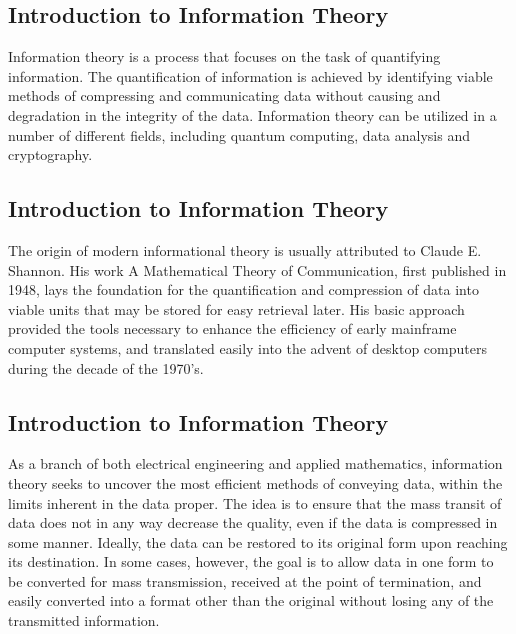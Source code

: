 


\begin{frame}
\subsection*{Introduction to Information Theory}
Information theory is a process that focuses on the task of quantifying information. 
The quantification of information is achieved by identifying viable methods of compressing and communicating data without causing 
and degradation in the integrity of the data. Information theory can be utilized in a number of different fields, including quantum computing, 
data analysis and cryptography.
\end{frame}
\begin{frame}
\subsection*{Introduction to Information Theory}
The origin of modern informational theory is usually attributed to Claude E. Shannon. His work A Mathematical Theory of Communication, first published in 1948, 
lays the foundation for the quantification and compression of data into viable units that may be stored for easy retrieval later. 
His basic approach provided the tools necessary to enhance the efficiency of early mainframe computer systems, and translated easily into 
the advent of desktop computers during the decade of the 1970’s.

\end{frame}
\begin{frame}
\subsection*{Introduction to Information Theory}
As a branch of both electrical engineering and applied mathematics, information theory seeks to uncover the most efficient 
methods of conveying data, within the limits inherent in the data proper. The idea is to ensure that the mass transit of data does 
not in any way decrease the quality, even if the data is compressed in some manner. 
Ideally, the data can be restored to its original form upon reaching its destination. 
In some cases, however, the goal is to allow data in one form to be converted for mass transmission, 
received at the point of termination, and easily converted into a format other than the original without losing any of the transmitted information.
\end{frame}

